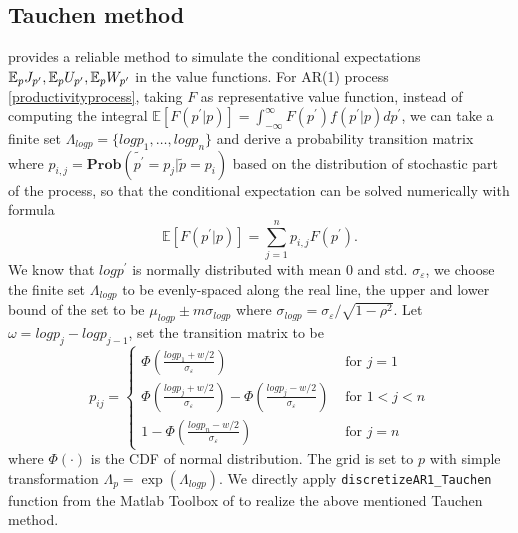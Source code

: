 \documentclass[10pt]{article} %
\begin{document}
    \subsection{Tauchen method}
    \cite{Tauchen1986} provides a reliable method to simulate the conditional expectations \(\mathbb{E}_p J_{p^\prime}, \\ \mathbb{E}_p U_{p^\prime}, \mathbb{E}_p W_{p^\prime}\) in the value functions. For AR(1) process \ref{productivityprocess}, taking $F$ as representative value function, instead of computing the integral \(\mathbb{E}[F(p^\prime|p)] = \int_{-\infty}^{\infty}F(p^\prime)f(p^\prime|p)dp^\prime\), we can take a finite set \(\Lambda_{logp} = \{logp_1, \ldots, logp_n\}\) and derive a probability transition matrix where \(p_{i,j}=\textbf{Prob} (\tilde{p^\prime} = p_j | \tilde{p} = p_i)\) based on the distribution of stochastic part of the process, so that the conditional expectation can be solved numerically with formula \[\mathbb{E}[F(p^\prime|p)] =\sum\limits_{j=1}^{n}p_{i,j}F(p^\prime).\]
    We know that $logp^\prime$ is normally distributed with mean 0 and std. $\sigma_\varepsilon$, we choose the finite set $\Lambda_{logp}$ to be evenly-spaced along the real line, the upper and lower bound of the set to be \(\mu_{logp} \pm m\sigma_{logp}\) where \(\sigma_{logp} = \sigma_\varepsilon/\sqrt{1-\rho^2}\). Let \(\omega = {logp}_j - {logp}_{j-1}\), set the transition matrix to be
    \[p_{i j}= \begin{cases}\Phi\left(\frac{logp_1+w / 2}{\sigma_{\varepsilon}}\right) & \text { for } j=1 \\ \Phi\left(\frac{logp_j+w / 2}{\sigma_{\varepsilon}}\right)-\Phi\left(\frac{logp_j-w / 2}{\sigma_{\varepsilon}}\right) & \text { for } 1<j<n \\ 1-\Phi\left(\frac{logp_n-w / 2}{\sigma_{\varepsilon}}\right) & \text { for } j=n\end{cases}\] where $\Phi(\cdot)$ is the CDF of normal distribution.
    The grid is set to $p$ with simple transformation $\Lambda_p = \exp{(\Lambda_{logp})}$.
    \newline
    We directly apply \texttt{discretizeAR1\_Tauchen} function from the Matlab Toolbox of \cite{Kirkby2023} to realize the above mentioned Tauchen method.
\end{document}
